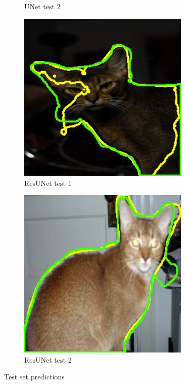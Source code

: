 \documentclass{homework}
\begin{document}
\begin{figure}[H]
\begin{subfigure}{0.20\textwidth}
        \caption{UNet test 2}
    \end{subfigure}
    \begin{subfigure}{0.20\textwidth}
        \centering
        \includegraphics[width=0.9\textwidth]{ResNet34_Unet_Abyssinian_4.jpg}
        \caption{ResUNet test 1}
    \end{subfigure}
    \begin{subfigure}{0.20\textwidth}
        \centering
        \includegraphics[width=0.9\textwidth]{ResNet34_Unet_Abyssinian_27.jpg}
        \caption{ResUNet test 2}
    \end{subfigure}
    \caption{Test set predictions}
    \label{fig:qualitative}
\end{figure}
\end{document}
